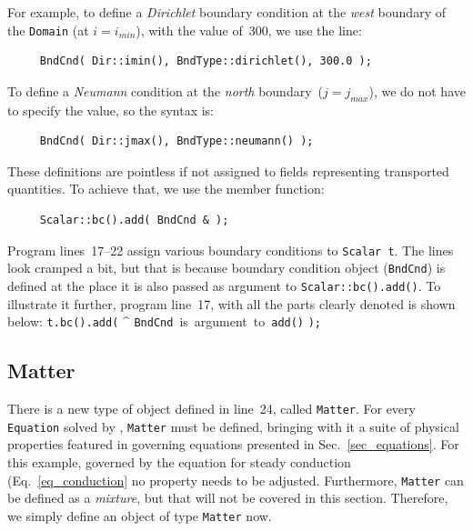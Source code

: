 For example, to define a {\em Dirichlet} boundary condition at the 
{\em west} boundary of the {\tt Domain} (at $i = i_{min}$), with the
value of~300, we use the line:
%
{\small \begin{verbatim}
     BndCnd( Dir::imin(), BndType::dirichlet(), 300.0 );
\end{verbatim}}
%
To define a {\em Neumann} condition at the {\em north} boundary~($j = j_{max}$),
we do not have to specify the value, so the syntax is:
%
{\small \begin{verbatim}
     BndCnd( Dir::jmax(), BndType::neumann() );
\end{verbatim}}
%
These definitions are pointless if not assigned to fields representing
transported quantities. To achieve that, we use the member function: 
%
{\small \begin{verbatim}
     Scalar::bc().add( BndCnd & );
\end{verbatim}}
%
Program lines~17--22 assign various boundary conditions to {\tt Scalar t}.
The lines look cramped a bit, but that is because boundary condition 
object ({\tt BndCnd}) is defined at the place it is also passed as 
argument to {\tt Scalar::bc().add()}. To illustrate it further, program line~17,
with all the parts clearly denoted is shown below:
%
\bea
{\tt t.bc().add(} \; ^{ \mbox{{\tt BndCnd} is argument to {\tt add()}} } 
          \; 
{\tt );} \nonumber
\eea

\subsection{Matter}

There is a new
type of object defined in line~24, called {\tt Matter}. For every {\tt Equation}
solved by {\psiboil}, {\tt Matter} must be defined, bringing with it a suite of
physical properties featured in governing equations presented in Sec.~\ref{sec_equations}.
For this example, governed by the equation for steady conduction (Eq.~\ref{eq_conduction}
no property needs to be adjusted. Furthermore, {\tt Matter} can be defined as a
{\em mixture}, but that will not be covered in this section. Therefore, we simply
define an object of type {\tt Matter} now. 

